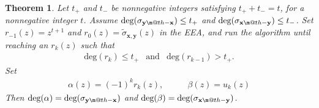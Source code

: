 \documentclass[pdflatex,sn-mathphys-num]{sn-jnl}
\makeatletter
\newcommand{\dotdiv}{\mathbin{\text{\@dotdiv}}}
\newcommand{\@dotdiv}{%
  \ooalign{\hidewidth\raise1ex\hbox{.}\hidewidth\cr$\m@th-$\cr}%
}
\newtheorem{theorem}{Theorem}
\theoremstyle{definition}
\newcommand{\vtr}[1]{\mathbf{#1}}
\makeatother
\begin{document}
\begin{theorem}
\label{theo:unique-sol}
Let $t_+$ and $t_-$ be nonnegative integers satisfying $t_+ + t_- = t$, for a nonnegative integer $t$. Assume $\text{deg}(\sigma_{\vtr{y} \dotdiv \vtr{x}}) \leq t_+$
 and $\text{deg}(\sigma_{\vtr{x} \dotdiv \vtr{y}}) \leq t_-$. Set $r_{-1}(z) = z^{t+1}$ and $r_0(z) = \tilde{\sigma}_{\vtr{x}, \vtr{y}}(z)$ in the EEA, and run the algorithm until reaching an $r_k(z)$ such that 
 \[
 \begin{matrix}
     \text{deg}(r_{k}) \leq t_+ & \text{and} & \text{deg}(r_{k-1}) > t_+. 
 \end{matrix}
 \]
 Set 
 \[
 \begin{matrix}
 \alpha(z) = (-1)^k r_k(z), & \qquad      \beta(z) = u_k(z) 
 \end{matrix}
 \]
 Then $\text{deg}(\alpha) = \text{deg}(\sigma_{\vtr{y} \dotdiv \vtr{x}}) $ and $\text{deg}(\beta) = \text{deg}(\sigma_{\vtr{x} \dotdiv \vtr{y}})$. 
\end{theorem}
\end{document}
